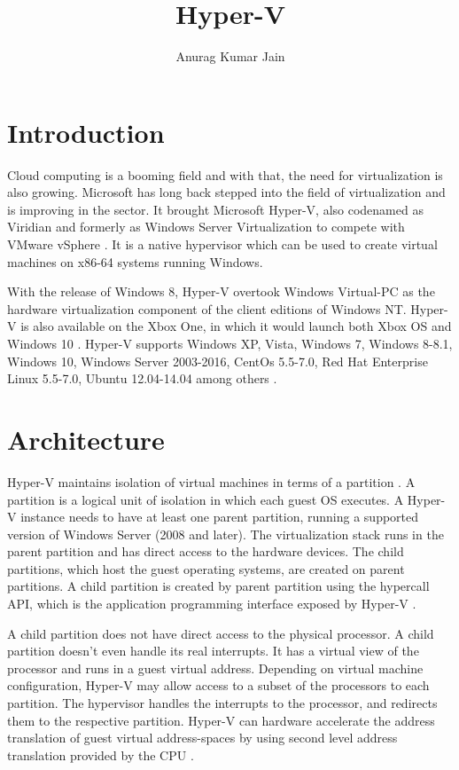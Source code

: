 \documentclass[9pt,twocolumn,twoside]{../../styles/osajnl}
\title{Hyper-V}
\author[1,*]{Anurag Kumar Jain}
\affil[1]{School of Informatics and Computing, Bloomington, IN 47408, U.S.A.}
\affil[*]{Corresponding authors: jainanur@iu.edu}
\begin{document}
\maketitle

\section{Introduction}

Cloud  computing is  a  booming  field and  with  that,  the need  for
virtualization is also  growing. Microsoft has long  back stepped into
the field of virtualization and is improving in the sector. It brought
Microsoft Hyper-V, also codenamed as  Viridian and formerly as Windows
Server    Virtualization    to    compete    with    VMware    vSphere
\cite{www-hyperv-wikipedia} \cite{www-hyperv-paper2}.  It is  a native
hypervisor  which can  be used  to create  virtual machines  on x86-64
systems running Windows.

With the release of Windows 8, Hyper-V overtook Windows Virtual-PC as
the hardware virtualization component of the client editions of
Windows NT. Hyper-V is also available on the Xbox One, in which it
would launch both Xbox OS and Windows 10
\cite{www-hyperv-wikipedia}. Hyper-V supports Windows XP, Vista,
Windows 7, Windows 8-8.1, Windows 10, Windows Server 2003-2016, CentOs
5.5-7.0, Red Hat Enterprise Linux 5.5-7.0, Ubuntu 12.04-14.04 among
others \cite{www-hyperv-paper2}.

\section{Architecture}

Hyper-V maintains isolation of virtual machines in terms of a
partition \cite{www-hyperv-wikipedia}. A partition is a logical unit
of isolation in which each guest OS executes. A Hyper-V instance needs
to have at least one parent partition, running a supported version of
Windows Server (2008 and later). The virtualization stack runs in the
parent partition and has direct access to the hardware devices. The
child partitions, which host the guest operating systems, are created
on parent partitions. A child partition is created by parent partition
using the hypercall API, which is the application programming
interface exposed by Hyper-V \cite{www-hyperv-architecture}.

A child partition does not have direct access to the physical
processor. A child partition doesn't even handle its real
interrupts. It has a virtual view of the processor and runs in a guest
virtual address. Depending on virtual machine configuration, Hyper-V
may allow access to a subset of the processors to each partition. The
hypervisor handles the interrupts to the processor, and redirects them
to the respective partition. Hyper-V can hardware accelerate the
address translation of guest virtual address-spaces by using second
level address translation provided by the CPU \cite{www-hyperv-paper}.
\end{document}

